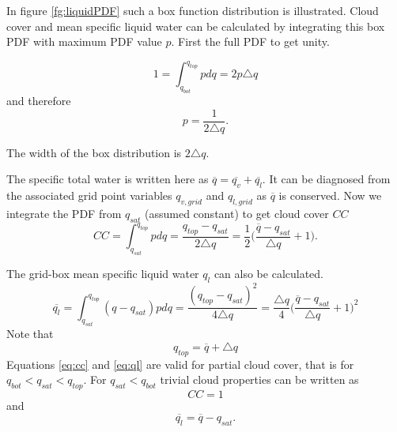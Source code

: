 \documentclass[a4paper,11pt]{article}
\begin{document}
In figure \ref{fg:liquidPDF} such a box function distribution is illustrated.  Cloud cover
and mean specific liquid water can be calculated by integrating this box PDF with maximum 
PDF value $p$.  First the full PDF to get unity.

\begin{equation}
1 =  \int_{q_{bot}}^{q_{top}} p dq = 2 p \triangle q 
\end{equation}
and therefore
\begin{equation}
p = \frac{1}{2 \triangle q }.
\end{equation}

The width of the box distribution is $2 \triangle q$. 

The specific total water is written here as $\overline{q}=\overline{q_v} + \overline{q_l}$.  It can be diagnosed from the associated 
grid point variables $q_{v,grid}$ and $q_{l,grid}$ as $\overline{q}$ is conserved.  
Now we integrate the PDF from $q_{sat}$ (assumed constant) to get cloud cover $CC$
\begin{equation}
CC =  \int_{q_{sat}}^{q_{top}} p dq = \frac{q_{top}-q_{sat}}{2 \triangle q} 
= \frac{1}{2}\Big(\frac{\overline{q}-q_{sat}}{\triangle q}+1\Big).
\label{eq:cc}
\end{equation}

The grid-box mean specific liquid water $q_{l}$ can also be calculated.
\begin{equation}
\overline{q_l} =  \int_{q_{sat}}^{q_{top}} (q - q_{sat}) p dq = \frac{(q_{top}-q_{sat})^2}{4 \triangle q} 
= \frac{\triangle q}{4}\Big(\frac{\overline{q}-q_{sat}}{\triangle q}+1\Big)^2
\label{eq:ql}
\end{equation}
%
Note that 
\begin{equation}
q_{top} = \overline{q} + \triangle q 
\end{equation}
%
Equations \ref{eq:cc} and \ref{eq:ql} are valid for partial cloud cover, that is for $q_{bot} < q_{sat} < q_{top}$.
For $q_{sat} < q_{bot}$ trivial cloud properties can be written as
\begin{equation}
CC = 1
\end{equation}
and
\begin{equation}
\overline{q_l} =  \overline{q} - q_{sat}.
\end{equation}
\end{document}
